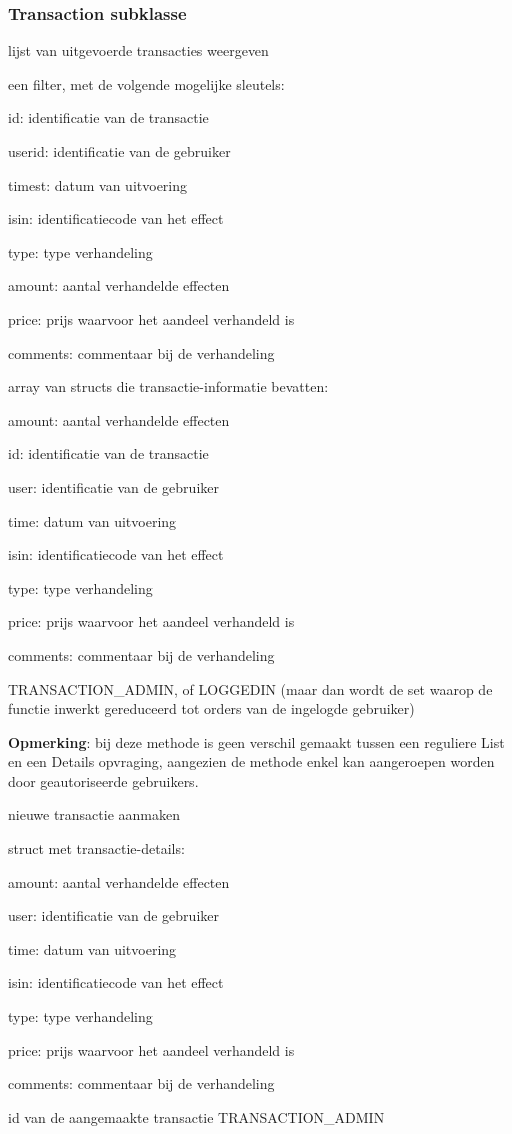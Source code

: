\subsubsection{Transaction subklasse}

	{ lijst van uitgevoerde transacties weergeven }
	{ een filter, met de volgende mogelijke sleutels:
		\begin{itemize_compact}
		\item{id: identificatie van de transactie}
		\item{userid: identificatie van de gebruiker}
		\item{timest: datum van uitvoering}
		\item{isin: identificatiecode van het effect}
		\item{type: type verhandeling}
		\item{amount: aantal verhandelde effecten}
		\item{price: prijs waarvoor het aandeel verhandeld is}
		\item{comments: commentaar bij de verhandeling}
		\end{itemize_compact} }
	{ array van structs die transactie-informatie bevatten:
		\begin{itemize_compact}
		\item{amount: aantal verhandelde effecten}
		\item{id: identificatie van de transactie}
		\item{user: identificatie van de gebruiker}
		\item{time: datum van uitvoering}
		\item{isin: identificatiecode van het effect}
		\item{type: type verhandeling}
		\item{price: prijs waarvoor het aandeel verhandeld is}
		\item{comments: commentaar bij de verhandeling}
		\end{itemize_compact} }
	{ TRANSACTION\_ADMIN, of LOGGEDIN (maar dan wordt de set waarop de functie inwerkt gereduceerd tot orders van de ingelogde gebruiker) }

\textbf{Opmerking}: bij deze methode is geen verschil gemaakt tussen een reguliere List en een Details opvraging, aangezien de methode enkel kan aangeroepen worden door geautoriseerde gebruikers.

	{ nieuwe transactie aanmaken }
	{ struct met transactie-details:
		\begin{itemize_compact}
		\item{amount: aantal verhandelde effecten}
		\item{user: identificatie van de gebruiker}
		\item{time: datum van uitvoering}
		\item{isin: identificatiecode van het effect}
		\item{type: type verhandeling}
		\item{price: prijs waarvoor het aandeel verhandeld is}
		\item{comments: commentaar bij de verhandeling}
		\end{itemize_compact} }
	{ id van de aangemaakte transactie }
	{ TRANSACTION\_ADMIN }

